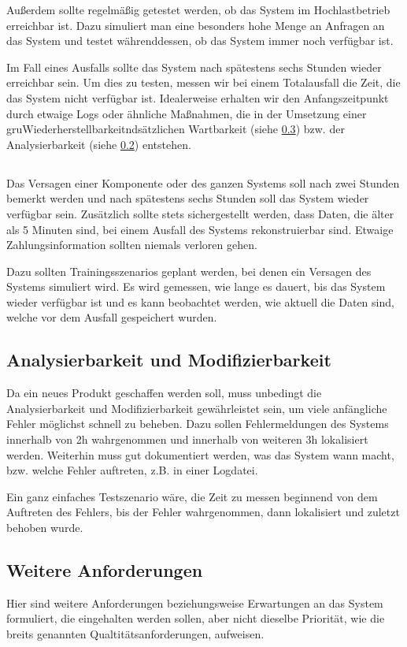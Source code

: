 Außerdem sollte regelmäßig getestet werden, ob das System im Hochlastbetrieb erreichbar ist.
Dazu simuliert man eine besonders hohe Menge an Anfragen an das System und testet währenddessen,
ob das System immer noch verfügbar ist.

Im Fall eines Ausfalls sollte das System nach spätestens sechs Stunden wieder erreichbar sein.
Um dies zu testen, messen wir bei einem Totalausfall die Zeit, die das System nicht verfügbar ist.
Idealerweise erhalten wir den Anfangszeitpunkt durch etwaige Logs oder ähnliche Maßnahmen,
die in der Umsetzung einer gruWiederherstellbarkeitndsätzlichen Wartbarkeit (siehe \ref{sec:other})
bzw. der Analysierbarkeit (siehe \ref{sec:anal}) entstehen.

\subsection{}
Das Versagen einer Komponente oder des ganzen Systems soll nach zwei Stunden bemerkt werden
und nach spätestens sechs Stunden soll das System wieder verfügbar sein.
Zusätzlich sollte stets sichergestellt werden, dass Daten, die älter als 5 Minuten sind, bei einem Ausfall des Systems rekonstruierbar sind.
Etwaige Zahlungsinformation sollten niemals verloren gehen.

Dazu sollten Trainingsszenarios geplant werden, bei denen ein Versagen des Systems simuliert wird.
Es wird gemessen, wie lange es dauert, bis das System wieder verfügbar ist und es kann beobachtet werden,
wie aktuell die Daten sind, welche vor dem Ausfall gespeichert wurden.


\subsection{Analysierbarkeit und Modifizierbarkeit} \label{sec:anal}
Da ein neues Produkt geschaffen werden soll, muss unbedingt die Analysierbarkeit und Modifizierbarkeit gewährleistet
sein, um viele anfängliche Fehler möglichst schnell zu beheben.
Dazu sollen Fehlermeldungen des Systems innerhalb von 2h wahrgenommen und innerhalb von weiteren 3h lokalisiert werden.
Weiterhin muss gut dokumentiert werden, was das System wann macht, bzw. welche Fehler auftreten, z.B. in einer Logdatei.

Ein ganz einfaches Testszenario wäre, die Zeit zu messen beginnend von dem Auftreten des Fehlers,
bis der Fehler wahrgenommen, dann lokalisiert und zuletzt behoben wurde.


\subsection{Weitere Anforderungen} \label{sec:other}
Hier sind weitere Anforderungen beziehungsweise Erwartungen an das System formuliert,
die eingehalten werden sollen, aber nicht dieselbe Priorität, wie die breits genannten Qualtitätsanforderungen, aufweisen.
